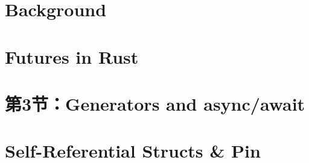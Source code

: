 \section{Background} %
\section{Futures in Rust} %
\section{第3节：Generators and async/await} %
\section{Self-Referential Structs \& Pin} %
